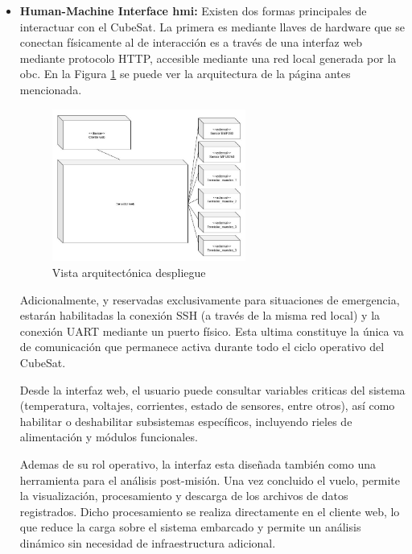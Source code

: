 \begin{itemize}
      \item \textbf{Human-Machine Interface \acrshort{hmi}:} Existen dos formas principales de interactuar con
        el CubeSat. La primera es mediante llaves de hardware que se conectan físicamente al
        de interacción es a través de una interfaz web mediante protocolo HTTP, accesible mediante una
        red local generada por la \acrshort{obc}. En la Figura \ref{fig:hmi-arq} se puede ver la arquitectura
        de la página antes mencionada.

        \begin{figure}[H]
          \centering
          \includegraphics[width=0.6\textwidth]{image/hmi/arquitectura.jpeg}
          \caption{Vista arquitectónica despliegue}
          \label{fig:hmi-arq}
        \end{figure}

        Adicionalmente, y reservadas exclusivamente para situaciones de emergencia, estarán
        habilitadas la conexión SSH (a través de la misma red local) y la conexión UART
        mediante un puerto físico. Esta ultima constituye la única va de comunicación que
        permanece activa durante todo el ciclo operativo del CubeSat.

        Desde la interfaz web, el usuario puede consultar variables criticas del sistema (temperatura, voltajes,
        corrientes, estado de sensores, entre otros), así como habilitar o
        deshabilitar subsistemas específicos, incluyendo rieles de alimentación y módulos funcionales.

        Ademas de su rol operativo, la interfaz esta diseñada también como una herramienta
        para el análisis post-misión. Una vez concluido el vuelo, permite la visualización, procesamiento
        y descarga de los archivos de datos registrados. Dicho procesamiento se realiza
        directamente en el cliente web, lo que reduce la carga sobre el sistema embarcado y
        permite un análisis dinámico sin necesidad de infraestructura adicional.


\end{itemize}
